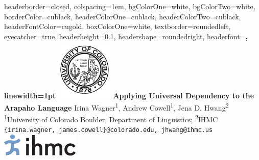 \documentclass[portrait,a0paper,fontscale=0.36]{baposter} %
\begin{document}
\begin{poster}
{
headerborder=closed, %
colspacing=1em, %
bgColorOne=white, %
bgColorTwo=white, %
borderColor=cublack, %
headerColorOne=cublack, %
headerColorTwo=cublack, %
headerFontColor=cugold, %
boxColorOne=white, %
textborder=roundedleft, %
eyecatcher=true, %
headerheight=0.1\textheight, %
headershape=roundedright, %
headerfont=\Large\bf, %
linewidth=1pt %
}
%
{\includegraphics[height=8em]{culogo.png}}
{\textbf{\huge Applying Universal Dependency  to the Arapaho Language \vspace{0.1em}
}\vspace{0.15em}} %
{Irina Wagner\textsuperscript{1}, Andrew Cowell\textsuperscript{1}, Jena D. Hwang\textsuperscript{2} \\
\hspace{6pt}\hspace{6pt}\textsuperscript{1}University of Colorado Boulder,
  Department of Linguistics; \textsuperscript{2}IHMC\\
  \vspace{0.05in} \small {\tt \{irina.wagner, james.cowell\}@colorado.edu,  jhwang@ihmc.us}} %
{\includegraphics[height=3em]{ihmc.png}} %


\end{poster}
\end{document}
